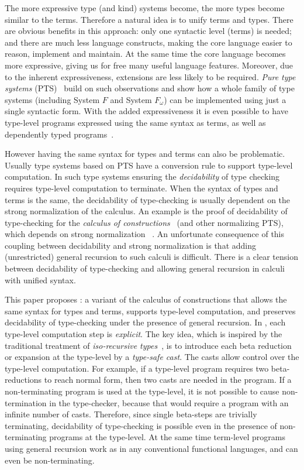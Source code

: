 The more expressive type (and kind) systems become, the more types become similar
to the terms. Therefore a natural idea is to unify terms and
types. There are obvious benefits in this approach: only one syntactic
level (terms) is needed; and there are much less language constructs,
making the core language easier to reason, implement and maintain. At the same
time the core language becomes more expressive, giving us for free
many useful language features. Moreover, due to the inherent
expressiveness, extensions are less likely to be required.
\emph{Pure type systems} (PTS)~\cite{handbook} build
on such observations and show how a whole family of type systems
(including System $F$ and System $F_{\omega}$) can be implemented
using just a single syntactic form. With the added expressiveness it
is even possible to have type-level programs expressed using the same
syntax as terms, as well as dependently typed programs~\cite{coc}.

However having the same syntax for types and terms can also be
problematic. Usually type systems based on PTS have a conversion rule
to support type-level computation.  In such type systems ensuring the
\emph{decidability} of type checking requires type-level computation
to terminate. When the syntax of types and terms is the same, the
decidability of type-checking is usually dependent on the strong
normalization of the calculus. An example is the proof
of decidability of type-checking for the \emph{calculus of
  constructions}~\cite{coc} (and other normalizing PTS),
which depends on strong normalization ~\cite{pts:normalize}. 
An unfortunate consequence of this coupling between
decidability and strong normalization is that adding (unrestricted)
general recursion to such calculi is difficult. There is a clear
tension between decidability of type-checking and allowing general
recursion in calculi with unified syntax.

This paper proposes \name: a variant of the calculus of constructions
that allows the same syntax for types and terms, supports type-level
computation, and preserves decidability of type-checking under the
presence of general recursion. In \name, each type-level computation
step is \emph{explicit}.  The key idea, which is inspired by the traditional
treatment of \emph{iso-recursive types}~\cite{tapl}, is to introduce each beta
reduction or expansion at the type-level by a \emph{type-safe
  cast}. The
casts allow control over the type-level computation. For example, if
a type-level program requires two beta-reductions to reach normal
form, then two casts are needed in the program. If a non-terminating
program is used at the type-level, it is not possible to cause
non-termination in the type-checker, because that would require a
program with an infinite number of casts. Therefore, since single beta-steps are
trivially terminating, decidability of type-checking is possible even
in the presence of non-terminating programs at the type-level. 
At the same time term-level programs using general recursion 
work as in any conventional functional languages, and can even 
be non-terminating. 

